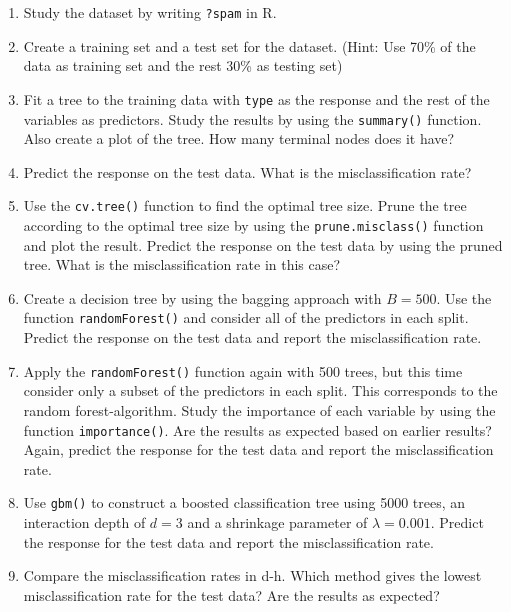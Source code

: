 \documentclass[
]{article}
\begin{document}
\begin{enumerate}
\def\labelenumi{\alph{enumi})}
\item
  Study the dataset by writing \texttt{?spam} in R.
\item
  Create a training set and a test set for the dataset. (Hint: Use 70\%
  of the data as training set and the rest 30\% as testing set)
\item
  Fit a tree to the training data with \texttt{type} as the response and
  the rest of the variables as predictors. Study the results by using
  the \texttt{summary()} function. Also create a plot of the tree. How
  many terminal nodes does it have?
\item
  Predict the response on the test data. What is the misclassification
  rate?
\item
  Use the \texttt{cv.tree()} function to find the optimal tree size.
  Prune the tree according to the optimal tree size by using the
  \texttt{prune.misclass()} function and plot the result. Predict the
  response on the test data by using the pruned tree. What is the
  misclassification rate in this case?
\item
  Create a decision tree by using the bagging approach with \(B=500\).
  Use the function \texttt{randomForest()} and consider all of the
  predictors in each split. Predict the response on the test data and
  report the misclassification rate.
\item
  Apply the \texttt{randomForest()} function again with 500 trees, but
  this time consider only a subset of the predictors in each split. This
  corresponds to the random forest-algorithm. Study the importance of
  each variable by using the function \texttt{importance()}. Are the
  results as expected based on earlier results? Again, predict the
  response for the test data and report the misclassification rate.
\item
  Use \texttt{gbm()} to construct a boosted classification tree using
  5000 trees, an interaction depth of \(d=3\) and a shrinkage parameter
  of \(\lambda=0.001\). Predict the response for the test data and
  report the misclassification rate.
\item
  Compare the misclassification rates in d-h. Which method gives the
  lowest misclassification rate for the test data? Are the results as
  expected?
\end{enumerate}
\end{document}
